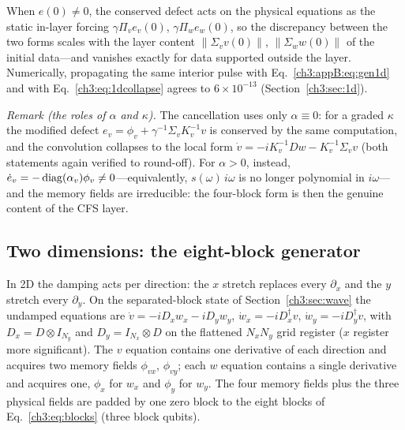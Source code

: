When $e(0)\neq0$, the conserved defect acts on the physical equations
as the static in-layer forcing $\gamma\Pi_ve_v(0)$,
$\gamma\Pi_we_w(0)$, so the discrepancy between the two forms scales
with the layer content $\lVert\Sigma_vv(0)\rVert$,
$\lVert\Sigma_ww(0)\rVert$ of the initial data---and vanishes exactly
for data supported outside the layer.  Numerically, propagating the
same interior pulse with Eq.~\eqref{ch3:appB:eq:gen1d} and with
Eq.~\eqref{ch3:eq:1dcollapse} agrees to $6\times10^{-13}$
(Section~\ref{ch3:sec:1d}).

\emph{Remark (the roles of $\alpha$ and $\kappa$).}  The cancellation
uses only $\alpha\equiv0$: for a graded $\kappa$ the modified defect
$e_v=\phi_v+\gamma^{-1}\Sigma_vK_v^{-1}v$ is conserved by the same
computation, and the convolution collapses to the local form
$\dot v=-iK_v^{-1}Dw-K_v^{-1}\Sigma_vv$ (both statements again verified
to round-off).  For $\alpha>0$, instead, $\dot e_v=-\operatorname{diag}(\alpha_v)\phi_v
\neq0$---equivalently, $s(\omega)\,i\omega$ is no longer polynomial in
$i\omega$---and the memory fields are irreducible: the four-block form
is then the genuine content of the CFS layer.

\subsection{Two dimensions: the eight-block generator}
\label{ch3:appB:2d}

In 2D the damping acts per direction: the $x$ stretch replaces every
$\partial_x$ and the $y$ stretch every $\partial_y$.  On the
separated-block state of Section~\ref{ch3:sec:wave} the undamped equations are
$\dot v=-iD_xw_x-iD_yw_y$, $\dot w_x=-iD_x^{\dagger}v$,
$\dot w_y=-iD_y^{\dagger}v$, with $D_x=D\otimes I_{N_y}$ and
$D_y=I_{N_x}\otimes D$ on the flattened $N_xN_y$ grid register ($x$
register more significant).  The $v$ equation contains one derivative
of each direction and acquires two memory fields $\phi_{vx}$,
$\phi_{vy}$; each $w$ equation contains a single derivative and
acquires one, $\phi_x$ for $w_x$ and $\phi_y$ for $w_y$.  The four
memory fields plus the three physical fields are padded by one zero
block to the eight blocks of Eq.~\eqref{ch3:eq:blocks} (three block
qubits).

